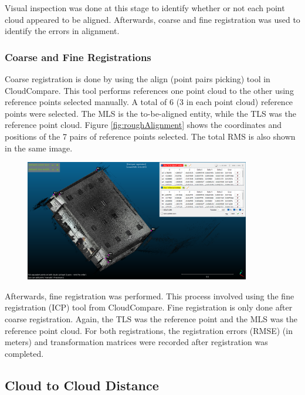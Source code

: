 \documentclass[man]{apa7}
\begin{document}
\begin{minipage}{\linewidth}
  \label{fig:manualAlignment}
\end{minipage}

Visual inspection was done at this stage to identify whether or not each point cloud appeared to be aligned. Afterwards, coarse and fine registration was used to identify the errors in alignment.

\subsubsection{Coarse and Fine Registrations}
Coarse registration is done by using the align (point pairs picking) tool in CloudCompare. This tool performs references one point cloud to the other using reference points selected manually. A total of 6 (3 in each point cloud) reference points were selected. The MLS is the to-be-aligned entity, while the TLS was the reference point cloud. Figure \ref{fig:roughAlignment} shows the coordinates and positions of the 7 pairs of reference points selected. The total RMS is also shown in the same image.

\begin{minipage}{\linewidth}
  \includegraphics[height=200px,width=450px]{figures/RoughAlignment1.png}
  \label{fig:roughAlignment}
\end{minipage}

Afterwards, fine registration was performed. This process involved using the fine registration (ICP) tool from CloudCompare. Fine registration is only done after coarse registration. Again, the TLS was the reference point and the MLS was the reference point cloud. For both registrations, the registration errors (RMSE) (in meters) and transformation matrices were recorded after registration was completed.

\subsection{Cloud to Cloud Distance}
\end{document}
